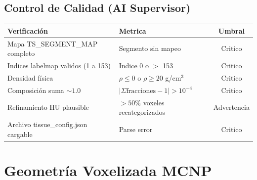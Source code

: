 \documentclass[12pt,a4paper]{article}
\begin{document}
\begin{tcolorbox}[aiSupervisor]

\begin{tcolorbox}[aiSupervisor]
\subsection*{Control de Calidad (AI Supervisor)}

\begin{table}[H]
\centering
\begin{tabular}{llc}
\toprule
\textbf{Verificación} & \textbf{Metrica} & \textbf{Umbral} \\
\midrule
Mapa TS\_SEGMENT\_MAP completo & Segmento sin mapeo & Critico \\
Indices labelmap validos (1 a 153) & Indice 0 o $>$ 153 & Critico \\
Densidad física & $\rho \leq 0$ o $\rho \geq 20$ g/cm$^3$ & Critico \\
Composición suma $\sim 1.0$ & $|\Sigma \text{fracciones} - 1| > 10^{-4}$ & Critico \\
Refinamiento HU plausible & $> 50\%$ voxeles recategorizados & Advertencia \\
Archivo tissue\_config.json cargable & Parse error & Critico \\
\bottomrule
\end{tabular}
\end{table}

\newpage


\newpage


\newpage


\newpage

\end{tcolorbox}
\end{tcolorbox}
\section{Geometría Voxelizada MCNP}
\label{sec:geometria}
\end{document}
